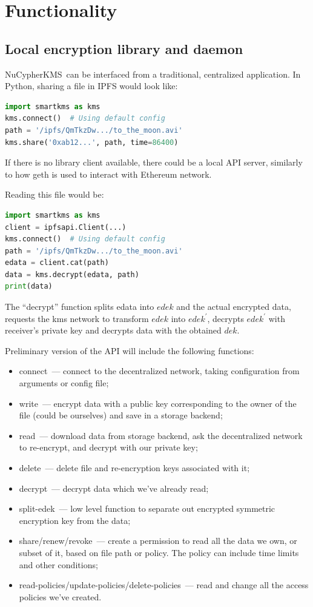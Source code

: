 \documentclass[notitlepage,longbibliography]{revtex4-1}
\newcommand{\kms}{NuCypherKMS}
\begin{document}
\section{Functionality}

\subsection{Local encryption library and daemon}

\kms~can be interfaced from a traditional, centralized application.
In Python, sharing a file in IPFS would look like:
\begin{lstlisting}[frame=single,language=Python]
import smartkms as kms
kms.connect()  # Using default config
path = '/ipfs/QmTkzDw.../to_the_moon.avi'
kms.share('0xab12...', path, time=86400)
\end{lstlisting}
If there is no library client available, there could be a local API server, similarly to how geth is used to interact with Ethereum network.

Reading this file would be:
\begin{lstlisting}[frame=single,language=Python]
import smartkms as kms
client = ipfsapi.Client(...)
kms.connect()  # Using default config
path = '/ipfs/QmTkzDw.../to_the_moon.avi'
edata = client.cat(path)
data = kms.decrypt(edata, path)
print(data)
\end{lstlisting}
The ``decrypt'' function splits edata into $edek$ and the actual encrypted data,
requests the kms network to transform $edek$ into $edek^{\prime}$,
decrypts $edek^{\prime}$ with receiver's private key and
decrypts data with the obtained $dek$.

Preliminary version of the API will include the following functions:
\begin{itemize}
    \item connect~--- connect to the decentralized network,
        taking configuration from arguments or config file;
    \item write~--- encrypt data with a public key corresponding to the owner of the file (could be ourselves) and save in a storage backend;
    \item read~--- download data from storage backend, ask the decentralized network to re-encrypt, and decrypt with our private key;
    \item delete~--- delete file and re-encryption keys associated with it;
    \item decrypt~--- decrypt data which we've already read;
    \item split-edek~--- low level function to separate out encrypted symmetric encryption key from the data;
    \item share/renew/revoke~--- create a permission to read all the data we own, or subset of it, based on file path or policy.
        The policy can include time limits and other conditions;
    \item read-policies/update-policies/delete-policies~--- read and change all the access policies we've created.
\end{itemize}
\end{document}
